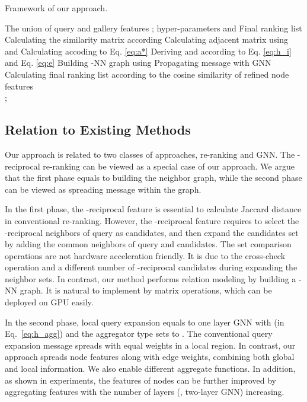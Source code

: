 \documentclass[10pt,twocolumn,letterpaper]{article}
\begin{document}
\begin{algorithm}[htb]  
  \caption{ Framework of our approach.}  
  \label{alg:Framwork}  
  \begin{algorithmic}[1]  
    \Require  
    The union of query and gallery features ; hyper-parameters  and   
    \Ensure  
      Final ranking list 
    \State Calculating the similarity matrix   according 
    \label{code:similarity}  
    \State Calculating adjacent matrix  using  and 
    \label{code:adj} 
    \State Calculating  accoding to Eq. \ref{eq:a*}
    \label{code:modify adj} 
    \State Deriving  and  according to Eq. \ref{eq:h_i} and Eq. \ref{eq:e}
    \label{code:fram:add}  
    \State Building -NN graph using  
    \label{code:fram:build graph}  
    \State Propagating message with GNN  
    \label{code:fram:propagate}  
    \State Calculating final ranking list  according to the cosine similarity of refined node features  
    \label{code:fram:similarity} \\  
    \Return ;  
  \end{algorithmic}  
\end{algorithm}  

\subsection{Relation to Existing Methods}  
Our approach is related to two classes of approaches, re-ranking and GNN. The -reciprocal re-ranking \cite{zhong2017re} can be viewed as a special case of our approach. We argue that the first phase equals to building the neighbor graph, while the second phase can be viewed as spreading message within the graph.  

In the first phase, the -reciprocal feature is essential to calculate Jaccard distance in conventional re-ranking. However, the -reciprocal feature requires to select the -reciprocal neighbors of query as candidates, and then expand the candidates set by adding the common neighbors of query and candidates. The set comparison operations are not hardware acceleration friendly. It is due to the cross-check operation and a different number of -reciprocal candidates during expanding the neighbor sets. 
In contrast, our method performs relation modeling by building a -NN graph. It is natural to implement by matrix operations, which can be deployed on GPU easily. 
 
In the second phase, local query expansion equals to one layer GNN with  (in Eq.~\ref{eq:h_agg}) and the aggregator type sets to . 
The conventional query expansion message spreads with equal weights in a local region. In contrast, our approach spreads node features along with edge weights, combining both global and local information. We also enable different aggregate functions. In addition, as shown in experiments, the features of nodes can be further improved by aggregating features with the number of layers (\ie, two-layer GNN) increasing.
\end{document}
